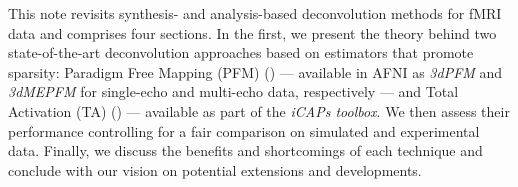 This note revisits synthesis- and analysis-based deconvolution methods for fMRI data and comprises four sections. In the first, we present the theory behind two state-of-the-art deconvolution approaches based on estimators that promote sparsity: Paradigm Free Mapping (PFM) (\citealt{caballerogaudes2013ParadigmFreeMapping}) --- available in AFNI as \textit{3dPFM} and \textit{3dMEPFM} for single-echo and multi-echo data, respectively --- and Total Activation (TA) (\citealt{karahanoglu2013TotalActivationfMRI}) --- available as part of the \textit{iCAPs toolbox}. We then assess their performance controlling for a fair comparison on simulated and experimental data. Finally, we discuss the benefits and shortcomings of each technique and conclude with our vision on potential extensions and developments.
